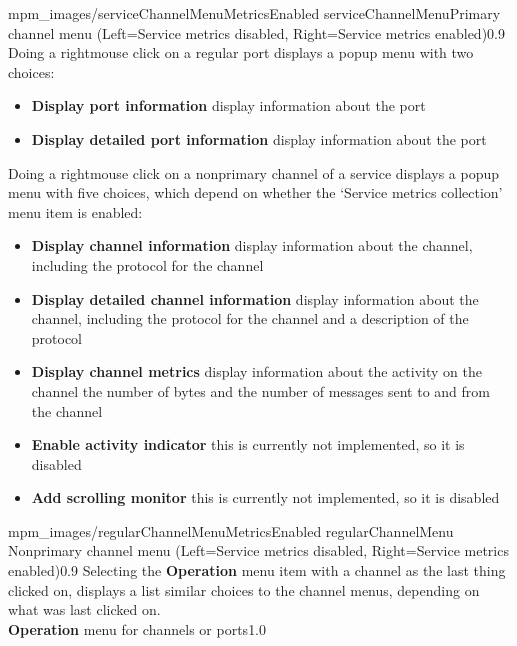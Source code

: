 %
{mpm_images/serviceChannelMenuMetricsEnabled}%
{serviceChannelMenu}{Primary channel menu (Left=Service metrics disabled, Right=Service
metrics enabled)}{0.9}
Doing a right\longDash{}mouse click on a regular port displays a popup menu with two
choices:
\begin{itemize}
\item\textbf{Display port information} display information about the port
\item\exSp\textbf{Display detailed port information} display information about the port
\end{itemize}
\condPage{}
Doing a right\longDash{}mouse click on a non\longDash{}primary channel of a service
displays a popup menu with five choices, which depend on whether the `Service metrics
collection' menu item is enabled:
\begin{itemize}
\item\textbf{Display channel information} display information about the channel,
including the protocol for the channel
\item\exSp\textbf{Display detailed channel information} display information about the
channel, including the protocol for the channel and a description of the protocol
\item\exSp\textbf{Display channel metrics} display information about the activity on the
channel \longDash{} the number of bytes and the number of messages sent to and from the
channel
\item\exSp\textbf{Enable activity indicator} \longDash{} this is currently not
implemented, so it is disabled
\item\exSp\textbf{Add scrolling monitor} \longDash{} this is currently not implemented, so
it is disabled
\end{itemize}
%
{mpm_images/regularChannelMenuMetricsEnabled}%
{regularChannelMenu}%
{Non\longDash{}primary channel menu (Left=Service metrics disabled, Right=Service metrics
enabled)}{0.9}
\condPage{}
Selecting the \textbf{Operation} menu item with a channel as the last thing clicked on,
displays a list similar choices to the channel menus, depending on what was last
clicked on.\\
%
{\textbf{Operation} menu for channels or ports}{1.0}
